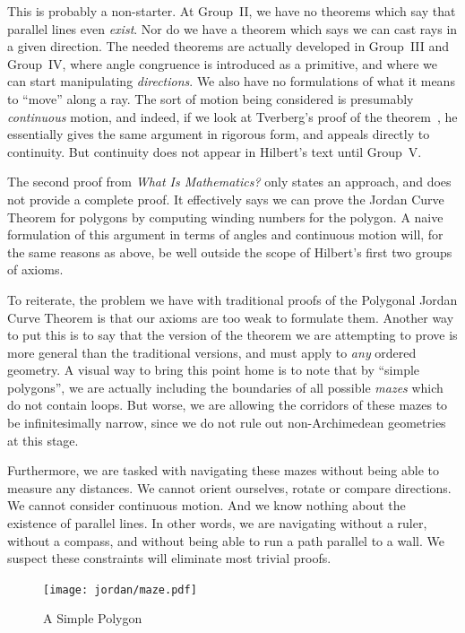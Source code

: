 This is probably a non-starter. At Group~II, we have no theorems which say that parallel lines even \emph{exist}. Nor do we have a theorem which says we can cast rays in a given direction. The needed theorems are actually developed in Group~III and Group~IV, where angle congruence is introduced as a primitive, and where we can start manipulating \emph{directions}. We also have no formulations of what it means to ``move'' along a ray. The sort of motion being considered is presumably \emph{continuous} motion, and indeed, if we look at Tverberg's proof of the theorem~\cite{TverbergJordan}, he essentially gives the same argument in rigorous form, and appeals directly to continuity. But  continuity does not appear in Hilbert's text until Group~V. 

The second proof from \emph{What Is Mathematics?} only states an approach, and does not provide a complete proof. It effectively says we can prove the Jordan Curve Theorem for polygons by computing winding numbers for the polygon. A naive formulation of this argument in terms of angles and continuous motion will, for the same reasons as above, be well outside the scope of Hilbert's first two groups of axioms. 

To reiterate, the problem we have with traditional proofs of the Polygonal Jordan Curve Theorem is that our axioms are too weak to formulate them. Another way to put this is to say that the version of the theorem we are attempting to prove is more general than the traditional versions, and must apply to \emph{any} ordered geometry. A visual way to bring this point home is to note that by ``simple polygons'', we are actually including the boundaries of all possible \emph{mazes} which do not contain loops. But worse, we are allowing the corridors of these mazes to be infinitesimally narrow, since we do not rule out non-Archimedean geometries at this stage.

Furthermore, we are tasked with navigating these mazes without being able to measure any distances. We cannot orient ourselves, rotate or compare directions. We cannot consider continuous motion. And we know nothing about the existence of parallel lines. In other words, we are navigating without a ruler, without a compass, and without being able to run a path parallel to a wall. We suspect these constraints will eliminate most trivial proofs.

\begin{figure}
\centering
\texttt{[image: jordan/maze.pdf]}
\caption{A Simple Polygon}
\end{figure}

